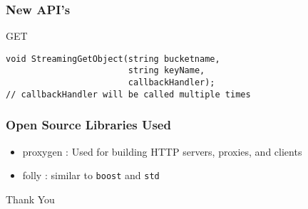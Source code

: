 \documentclass{beamer}
\begin{document}
\begin{frame}[fragile]
\frametitle{New API's}

\begin{block} {GET}
\begin{lstlisting}
void StreamingGetObject(string bucketname,
                        string keyName,
                        callbackHandler);
// callbackHandler will be called multiple times
\end{lstlisting}
\end{block}
\end{frame}


\begin{frame}[fragile]
\frametitle{Open Source Libraries Used}

\begin{itemize}

\item proxygen : Used for building HTTP servers, proxies, and clients
\item folly    : similar to \texttt{boost} and \texttt{std}

\end{itemize}

\end{frame}


\begin{frame}
\Huge{\centerline{Thank You}}
\end{frame}





\end{document}
